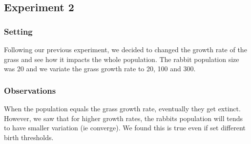 \documentclass[11pt]{article}
\begin{document}
\subsection{Experiment 2}

\subsubsection{Setting}

Following our previous experiment, we decided to changed the growth rate of the grass and see how it impacts the whole population. The rabbit population size was 20 and we variate the grass growth rate to 20, 100 and 300.

\subsubsection{Observations}

When the population equals the grass growth rate, eventually they get extinct. However, we saw that for higher growth rates, the rabbits population will tends to have smaller variation (ie converge). We found this is true even if set different birth thresholds.
\end{document}
